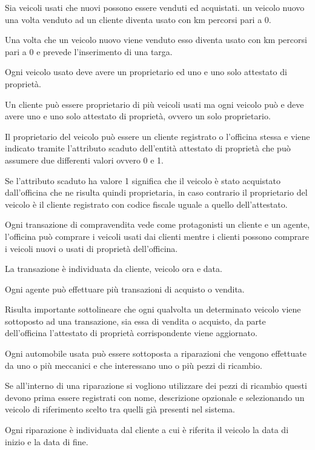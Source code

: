 \documentclass[a4paper,12pt]{report}
\begin{document}
Sia veicoli usati che nuovi possono essere venduti ed acquistati. un veicolo nuovo una volta venduto ad un cliente diventa usato 
%
con km percorsi pari a 0.

Una volta che un veicolo nuovo viene venduto esso diventa usato con km percorsi pari a 0 e prevede l’inserimento di una targa.

Ogni veicolo usato deve avere un proprietario ed uno e uno solo attestato di proprietà.

Un cliente può essere proprietario di più veicoli usati ma ogni veicolo può e deve avere uno e uno solo attestato di proprietà, 
%
ovvero un solo proprietario. 

Il proprietario del veicolo può essere un cliente registrato o l’officina stessa e viene indicato tramite l’attributo scaduto 
%
dell’entità attestato di proprietà che può assumere due differenti valori ovvero 0 e 1.

Se l’attributo scaduto ha valore 1 significa che il veicolo è stato acquistato dall’officina che ne risulta quindi proprietaria, 
%
in caso contrario il proprietario del veicolo è il cliente registrato con codice fiscale uguale a quello dell’attestato.

Ogni transazione di compravendita vede come protagonisti un cliente e un agente, l’officina può comprare i veicoli usati dai clienti 
%
mentre i clienti possono comprare i veicoli nuovi o usati di proprietà dell’officina.

La transazione è individuata da cliente, veicolo ora e data.

Ogni agente può effettuare più transazioni di acquisto o vendita.

Risulta importante sottolineare che ogni qualvolta un determinato veicolo viene sottoposto ad una transazione, sia essa di vendita o 
%
acquisto, da parte dell’officina l’attestato di proprietà corrispondente viene aggiornato.

Ogni automobile usata può essere sottoposta a riparazioni che vengono effettuate da uno o più meccanici e che interessano uno o più 
%
pezzi di ricambio.

Se all’interno di una riparazione si vogliono utilizzare dei pezzi di ricambio questi devono prima essere registrati con nome, 
%
descrizione opzionale e selezionando un veicolo di riferimento scelto tra quelli già presenti nel sistema.

Ogni riparazione è individuata dal cliente a cui è riferita il veicolo la data di inizio e la data di fine.
\end{document}
